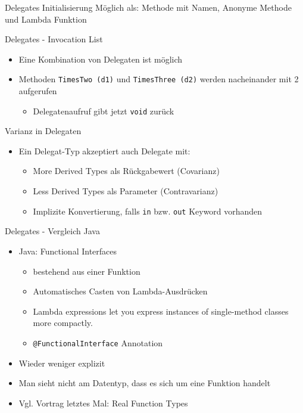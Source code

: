 \documentclass[11pt]{beamer}
\begin{document}
\begin{frame}{Delegates}
	Initialisierung Möglich als: Methode mit Namen, Anonyme Methode und Lambda Funktion
\end{frame}

\begin{frame}{Delegates - Invocation List}
	\begin{itemize}
		\item  Eine Kombination von Delegaten ist möglich
		\item Methoden \texttt{TimesTwo (d1)} und \texttt{TimesThree (d2)} werden nacheinander mit 2 aufgerufen
		\begin{itemize}
			\item Delegatenaufruf gibt jetzt \texttt{void} zurück
		\end{itemize}
	\end{itemize}
\end{frame}

\begin{frame}{Varianz in Delegaten}
	\begin{itemize}
	 	\item Ein Delegat-Typ akzeptiert auch Delegate mit:
	 	\begin{itemize}
	 		\item \glqq More Derived Types\grqq{} als Rückgabewert (Covarianz)
	 		\item \glqq Less Derived Types\grqq{} als Parameter (Contravarianz)
	 		\item Implizite Konvertierung, falls \texttt{in} bzw. \texttt{out} Keyword vorhanden
	 	\end{itemize}
	\end{itemize}
\end{frame}

\begin{frame}{Delegates - Vergleich Java}
	\begin{itemize}
		\item Java: Functional Interfaces
		\begin{itemize}
			\item bestehend aus einer Funktion
			\item Automatisches Casten von Lambda-Ausdrücken
			\item \glqq Lambda expressions let you express instances of single-method classes more compactly.\grqq
			\item \texttt{@FunctionalInterface} Annotation		
		\end{itemize}
		\item Wieder weniger explizit
		\item Man sieht nicht am Datentyp, dass es sich um eine Funktion handelt
		\item Vgl. Vortrag letztes Mal: \glqq Real Function Types\grqq
	\end{itemize}
\end{frame}
\end{document}
